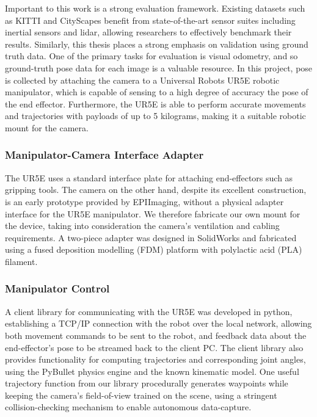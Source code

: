 Important to this work is a strong evaluation framework. Existing datasets such as KITTI and CityScapes benefit from state-of-the-art sensor suites including inertial sensors and lidar, allowing researchers to effectively benchmark their results. Similarly, this thesis places a strong emphasis on validation using ground truth data. One of the primary tasks for evaluation is visual odometry, and so ground-truth pose data for each image is a valuable resource. In this project, pose is collected by attaching the camera to a Universal Robots UR5E robotic manipulator, which is capable of sensing to a high degree of accuracy the pose of the end effector. Furthermore, the UR5E is able to perform accurate movements and trajectories with payloads of up to 5 kilograms, making it a suitable robotic mount for the camera. 

\subsubsection{Manipulator-Camera Interface Adapter}
The UR5E uses a standard interface plate for attaching end-effectors such as gripping tools. The camera on the other hand, despite its excellent construction, is an early prototype provided by EPIImaging, without a physical adapter interface for the UR5E manipulator. We therefore fabricate our own mount for the device, taking into consideration the camera's ventilation and cabling requirements. A two-piece adapter was designed in SolidWorks and fabricated using a fused deposition modelling (FDM) platform with polylactic acid (PLA) filament. 

\subsubsection{Manipulator Control}
A client library for communicating with the UR5E was developed in python, establishing a TCP/IP connection with the robot over the local network, allowing both movement commands to be sent to the robot, and feedback data about the end-effector's pose to be streamed back to the client PC. The client library also provides functionality for computing trajectories and corresponding joint angles, using the PyBullet \cite{pybullet2017} physics engine and the known kinematic model. One useful trajectory function from our library procedurally generates waypoints while keeping the camera's field-of-view trained on the scene, using a stringent collision-checking mechanism to enable autonomous data-capture. 

